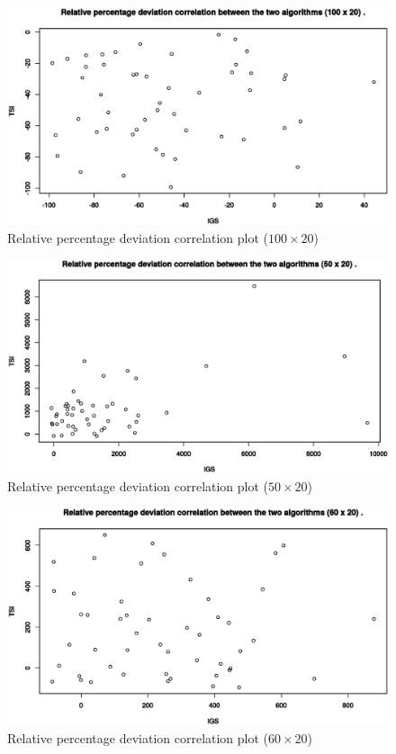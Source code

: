 

\begin{figure}[H]
	\centering
	\includegraphics[width=\textwidth]{fig/corr/100x20}
	\caption{Relative percentage deviation correlation plot ($100 \times 20$)}
\end{figure}

\begin{figure}[H]
	\centering
	\includegraphics[width=\textwidth]{fig/corr/50x20}
	\caption{Relative percentage deviation correlation plot ($50 \times 20$)}
\end{figure}

\begin{figure}[H]
	\centering
	\includegraphics[width=\textwidth]{fig/corr/60x20}
	\caption{Relative percentage deviation correlation plot ($60 \times 20$)}
\end{figure}

